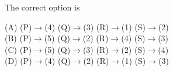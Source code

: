 \documentclass[12pt,a4paper]{article}
\begin{document}
\begin{enumerate}
The correct option is

(A) (P)$\to$(4) \quad (Q)$\to$(3) \quad (R)$\to$(1) \quad (S)$\to$(2) \\
(B) (P)$\to$(5) \quad (Q)$\to$(2) \quad (R)$\to$(4) \quad (S)$\to$(3) \\
(C) (P)$\to$(5) \quad (Q)$\to$(3) \quad (R)$\to$(2) \quad (S)$\to$(4) \\
(D) (P)$\to$(4) \quad (Q)$\to$(2) \quad (R)$\to$(1) \quad (S)$\to$(3) 
   
\end{enumerate}
\end{document}
